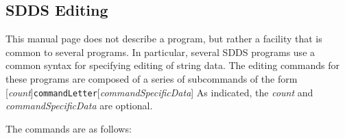 \newpage
\subsection{SDDS Editing}
\label{SDDSediting}

This manual page does not describe a program, but rather a facility that is common to several
programs.  In particular, several SDDS programs use a common syntax for specifying editing of
string data.  The editing commands for these programs are composed of a series of subcommands of
the form
[{\em count}]{\tt commandLetter}[{\em commandSpecificData}]
As indicated, the {\em count} and {\em commandSpecificData} are optional.

The commands are as follows:
